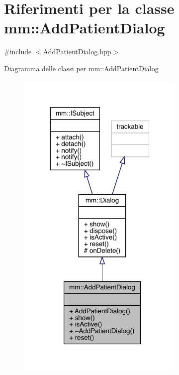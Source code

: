 \hypertarget{classmm_1_1_add_patient_dialog}{}\section{Riferimenti per la classe mm\+:\+:Add\+Patient\+Dialog}
\label{classmm_1_1_add_patient_dialog}


{\ttfamily \#include $<$Add\+Patient\+Dialog.\+hpp$>$}



Diagramma delle classi per mm\+:\+:Add\+Patient\+Dialog
\nopagebreak
\begin{figure}[H]
\begin{center}
\leavevmode
\includegraphics[width=228pt]{d7/d63/classmm_1_1_add_patient_dialog__inherit__graph}
\end{center}
\end{figure}


